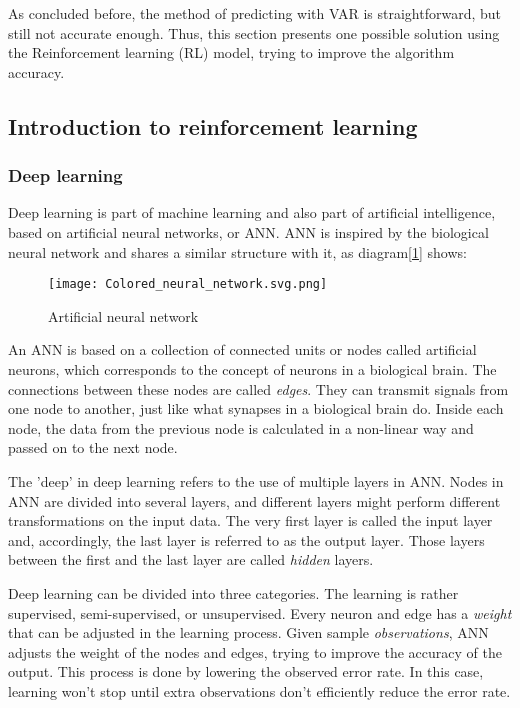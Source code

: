 \documentclass{mcmthesis}
\begin{document}
As concluded before,
the method of predicting with VAR is straightforward,
but still not accurate enough.
Thus, this section presents one possible solution using the Reinforcement learning (RL) model,
trying to improve the algorithm accuracy.

\subsection{Introduction to reinforcement learning}

\subsubsection{Deep learning}

Deep learning is part of machine learning and also part of artificial intelligence,
based on artificial neural networks, or ANN.
ANN is inspired by the biological neural network
and shares a similar structure with it, as diagram[\ref{ANN}] shows:

\begin{figure}[h]
\small
\centering
\texttt{[image: Colored\_neural\_network.svg.png]}
\caption{Artificial neural network} \label{ANN}
\end{figure}

An ANN is based on a collection of connected units or nodes called artificial neurons,
which corresponds to the concept of neurons in a biological brain.
The connections between these nodes are called \textit{edges}.
They can transmit signals from one node to another,
just like what synapses in a biological brain do.
Inside each node, the data from the previous node is calculated in a non-linear way
and passed on to the next node.

The 'deep' in deep learning refers to the use of multiple layers in ANN.
Nodes in ANN are divided into several layers,
and different layers might perform different transformations on the input data.
The very first layer is called the input layer and,
accordingly, the last layer is referred to as the output layer.
Those layers between the first and the last layer are called \textit{hidden} layers.

Deep learning can be divided into three categories.
The learning is rather supervised, semi-supervised, or unsupervised.
Every neuron and edge has a \textit{weight} that can be adjusted in the learning process.
Given sample \textit{observations}, ANN adjusts the weight of the nodes and edges,
trying to improve the accuracy of the output.
This process is done by lowering the observed error rate.
In this case, learning won't stop until
extra observations don't efficiently reduce the error rate.
\end{document}

